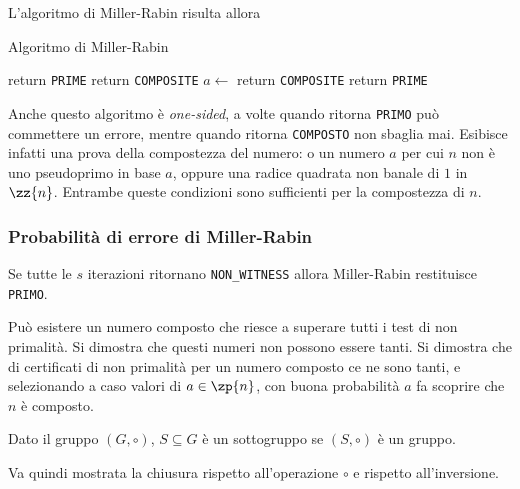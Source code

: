 L'algoritmo di Miller-Rabin risulta allora

\begin{algorithm}[H]
\caption{Algoritmo di Miller-Rabin}\label{alg:miller_rabin}
\begin{algorithmic}[1]
            \State return \texttt{PRIME}
        \EndIf
            \State return \texttt{COMPOSITE}
        \EndIf
            \State $a \gets $
                \State return \texttt{COMPOSITE}
            \EndIf
        \EndRepLoop
        \State return \texttt{PRIME}
    \EndProcedure
\end{algorithmic}
\end{algorithm}
\noindent
Anche questo algoritmo è \emph{one-sided},
a volte quando ritorna 
\texttt{PRIMO}
può commettere un errore, mentre
quando ritorna
\texttt{COMPOSTO}
non sbaglia mai.
Esibisce infatti una prova della compostezza del numero: o un numero $a$ per cui $n$ non è uno pseudoprimo in base $a$, oppure una radice quadrata non banale di $1$ in $\zz{n} $.
Entrambe queste condizioni sono sufficienti per la compostezza di $n$.

\subsubsection{Probabilità di errore di Miller-Rabin}

Se tutte le $s$ iterazioni ritornano
\texttt{NON\_WITNESS}
allora Miller-Rabin restituisce
\texttt{PRIMO}.

Può esistere un numero composto che riesce a superare tutti i test di non primalità. Si dimostra che questi numeri non possono essere tanti.
Si dimostra che di certificati di non primalità per un numero composto ce ne sono tanti, e selezionando a caso valori di $a \in \zp{n} $, con buona probabilità $a$ fa scoprire che $n$ è composto.

\begin{definition}
    [Sottogruppo]
    \label{def:sottogruppo}
    Dato il gruppo $
    \left( 
        G, \circ
    \right)
    $, $
    S \subseteq G
    $ è un sottogruppo se $
    \left( 
        S, \circ
    \right)
    $ è un gruppo.
\end{definition}
Va quindi mostrata la chiusura rispetto all'operazione $\circ$ e rispetto all'inversione.

